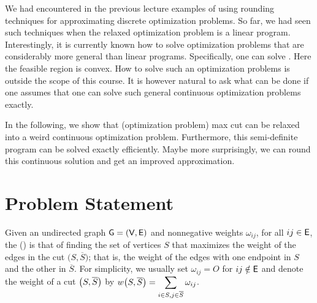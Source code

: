 %

%



\ChapterPrefix{} \ChapterGen{}


We had encountered in the previous lecture examples of using rounding
techniques for approximating discrete optimization problems. So far,
we had seen such techniques when the relaxed optimization problem is a
linear program. Interestingly, it is currently known how to solve
optimization problems that are considerably more general than linear
programs. Specifically, one can solve . Here
the feasible region is convex. How to solve such an optimization
problems is outside the scope of this course. It is however natural to
ask what can be done if one assumes that one can solve such general
continuous optimization problems exactly.

In the following, we show that (optimization problem) max cut can be
relaxed into a weird continuous optimization problem. Furthermore,
this semi-definite program can be solved exactly efficiently. Maybe
more surprisingly, we can round this continuous solution and get an
improved approximation.

\section{Problem Statement}



\newcommand{\WeightChar}{\omega}%

Given an undirected graph $\mathsf{G} = (\mathsf{V}, \mathsf{E})$ and
nonnegative weights $\WeightChar_{ij}$, for all $ij \in \mathsf{E}$, the
 () is that of finding
the set of vertices $S$ that maximizes the weight of the edges in the
cut $\bigl( S, \overline{S} \bigr)$; that is, the weight of the edges
with one endpoint in $S$ and the other in $\overline{S}$. For
simplicity, we usually set $\WeightChar_{ij}= O$ for
$ij \notin \mathsf{E}$ and denote the weight of a cut
$\pth[]{S, \overline{S}}$ by
$\displaystyle w\pth{S, \overline{S}} = \sum_{i \in S, j \in
   \overline{S}} \WeightChar_{ij}$.

